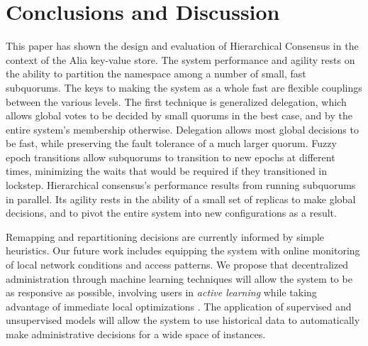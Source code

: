 \documentclass[letterpaper,10pt,twocolumn]{article}
\newcommand{\subs}{subquorums\xspace}
\newcommand{\sys}{Alia\xspace}
\begin{document}
\section{Conclusions and Discussion}
\label{sec:conclusions}

This paper has shown the design and evaluation of Hierarchical Consensus in the context of
the \sys key-value store.
The system performance and agility rests on the ability to partition the namespace among a
number of small, fast \subs.
The keys to making the system as a whole fast are flexible couplings between the various
levels.
The first technique is generalized delegation, which allows global votes to be decided
by small quorums in the best case, and by the entire system's membership
otherwise. Delegation allows most global decisions to be fast, while preserving the fault
tolerance of a much larger quorum.
Fuzzy epoch transitions allow \subs to transition to new epochs at different times,
minimizing the waits that would be required if they transitioned in lockstep.
Hierarchical consensus's performance results from running \subs in parallel. Its agility
rests in the ability of a small set of replicas to make global decisions, and to pivot the
entire system into new configurations as a result.

Remapping and repartitioning decisions are currently informed by simple heuristics.
Our future work includes equipping the system with online monitoring of local network
conditions and access patterns.
We propose that decentralized administration through machine learning techniques will
allow the system to be as responsive as possible, involving users in \emph{active
learning} \cite{kalai_efficient_2005,osugi_balancing_2005} while taking advantage of
immediate local optimizations \cite{oates_investigating_1998}.
The application of supervised and unsupervised models
will allow
the system to use historical data to automatically make administrative decisions for a wide space of instances.
\end{document}
